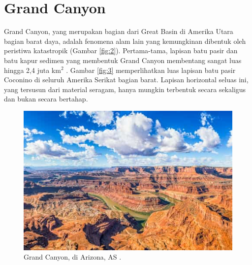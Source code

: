 \documentclass[10pt,twocolumn,letterpaper]{article}
\begin{document}
\section{Grand Canyon}

Grand Canyon, yang merupakan bagian dari Great Basin di Amerika Utara bagian barat daya, adalah fenomena alam lain yang kemungkinan dibentuk oleh peristiwa katastropik (Gambar \ref{fig:2}). Pertama-tama, lapisan batu pasir dan batu kapur sedimen yang membentuk Grand Canyon membentang sangat luas hingga 2,4 juta km$^2$ \cite{21}. Gambar \ref{fig:3} memperlihatkan luas lapisan batu pasir Coconino di seluruh Amerika Serikat bagian barat. Lapisan horizontal seluas ini, yang tersusun dari material seragam, hanya mungkin terbentuk secara sekaligus dan bukan secara bertahap.

\begin{figure}[t]
\begin{center}
   \includegraphics[width=1\linewidth]{grand-canyon.jpg}
\end{center}
   \caption{Grand Canyon, di Arizona, AS \cite{49}.}
\label{fig:2}
\label{fig:onecol}
\end{figure}
\end{document}
